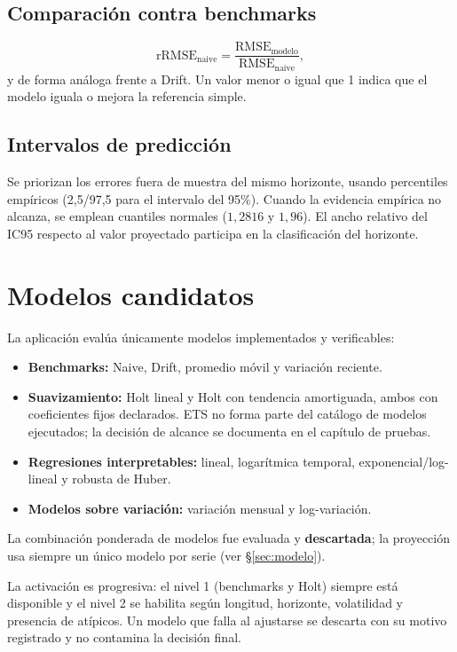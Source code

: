 \documentclass[11pt,letterpaper]{article}
\begin{document}
\subsection{Comparación contra benchmarks}
\begin{equation}
\mathrm{rRMSE}_{\text{naive}}=\frac{\mathrm{RMSE}_{\text{modelo}}}{\mathrm{RMSE}_{\text{naive}}},
\end{equation}
y de forma análoga frente a Drift. Un valor menor o igual que 1 indica que el
modelo iguala o mejora la referencia simple.

\subsection{Intervalos de predicción}
Se priorizan los errores fuera de muestra del mismo horizonte, usando
percentiles empíricos (2{,}5/97{,}5 para el intervalo del 95\%). Cuando la
evidencia empírica no alcanza, se emplean cuantiles normales
(\(1{,}2816\) y \(1{,}96\)). El ancho relativo del IC95 respecto al valor
proyectado participa en la clasificación del horizonte.

\section{Modelos candidatos}

La aplicación evalúa únicamente modelos implementados y verificables:

\begin{itemize}
  \item \textbf{Benchmarks:} Naive, Drift, promedio móvil y variación reciente.
  \item \textbf{Suavizamiento:} Holt lineal y Holt con tendencia amortiguada, ambos con coeficientes fijos declarados. ETS no forma parte del catálogo de modelos ejecutados; la decisión de alcance se documenta en el capítulo de pruebas.
  \item \textbf{Regresiones interpretables:} lineal, logarítmica temporal, exponencial/log-lineal y robusta de Huber.
  \item \textbf{Modelos sobre variación:} variación mensual y log-variación.
\end{itemize}

La combinación ponderada de modelos fue evaluada y \textbf{descartada}; la
proyección usa siempre un único modelo por serie (ver \S\ref{sec:modelo}).

La activación es progresiva: el nivel 1 (benchmarks y Holt) siempre está
disponible y el nivel 2 se habilita según longitud, horizonte, volatilidad y
presencia de atípicos. Un modelo que falla al ajustarse se descarta con su
motivo registrado y no contamina la decisión final.
\end{document}
